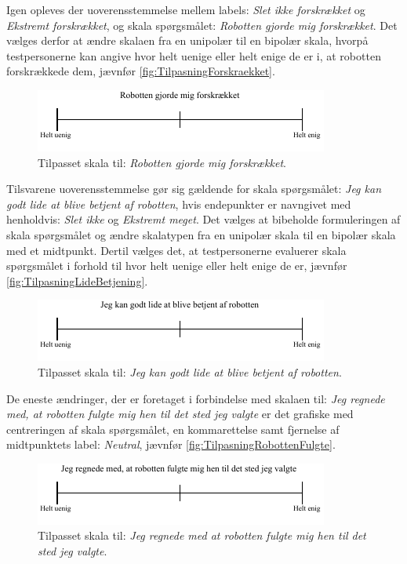 Igen opleves der uoverensstemmelse mellem labels: \textit{Slet ikke forskrækket} og \textit{Ekstremt forskrækket}, og skala spørgsmålet: \textit{Robotten gjorde mig forskrækket}. Det vælges derfor at ændre skalaen fra en unipolær til en bipolær skala, hvorpå testpersonerne kan angive hvor helt uenige eller helt enige de er i, at robotten forskrækkede dem, jævnfør \autoref{fig:TilpasningForskraekket}.
%
\begin{figure}[H]
\centering
\includegraphics[width =\textwidth]{Figure/TilpasningAfSkalaer/TilpassetForskraekket} 
\caption{Tilpasset skala til: \textit{Robotten gjorde mig forskrækket}.}
\label{fig:TilpasningForskraekket}
\end{figure}
\noindent
% 
Tilsvarene uoverensstemmelse gør sig gældende for skala spørgsmålet: \textit{Jeg kan godt lide at blive betjent af robotten}, hvis endepunkter er navngivet med henholdvis: \textit{Slet ikke} og \textit{Ekstremt meget}. Det vælges at bibeholde formuleringen af skala spørgsmålet og ændre skalatypen fra en unipolær skala til en bipolær skala med et midtpunkt. Dertil vælges det, at testpersonerne evaluerer skala spørgsmålet i forhold til hvor helt uenige eller helt enige de er, jævnfør \autoref{fig:TilpasningLideBetjening}.   
%
\begin{figure}[H]
\centering
\includegraphics[width =\textwidth]{Figure/TilpasningAfSkalaer/TilpassetLideBetjening} 
\caption{Tilpasset skala til: \textit{Jeg kan godt lide at blive betjent af robotten}.}
\label{fig:TilpasningLideBetjening}
\end{figure}
\newpage
\noindent
% 
De eneste ændringer, der er foretaget i forbindelse med skalaen til: \textit{Jeg regnede med, at robotten fulgte mig hen til det sted jeg valgte} er det grafiske med centreringen af skala spørgsmålet, en kommarettelse samt fjernelse af midtpunktets label: \textit{Neutral}, jævnfør \autoref{fig:TilpasningRobottenFulgte}.
%
\begin{figure}[H]
\centering
\includegraphics[width =\textwidth]{Figure/TilpasningAfSkalaer/TilpassetRobottenFulgteMigDetRigtigeStedHen} 
\caption{Tilpasset skala til: \textit{Jeg regnede med at robotten fulgte mig hen til det sted jeg valgte}.}
\label{fig:TilpasningRobottenFulgte}
\end{figure}
